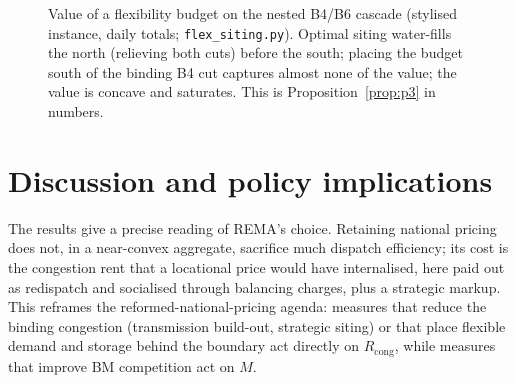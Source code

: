 \documentclass[review,3p,times]{elsarticle}
\theoremstyle{plain}
\theoremstyle{definition}
\begin{document}
\begin{figure}[t]
\centering
{}
\caption{Value of a flexibility budget on the nested B4/B6 cascade (stylised
instance, daily totals; \texttt{flex\_siting.py}). Optimal siting water-fills the
north (relieving both cuts) before the south; placing the budget south of the
binding B4 cut captures almost none of the value; the value is concave and
saturates. This is Proposition~\ref{prop:p3} in numbers.}
\label{fig:siting}
\end{figure}

\section{Discussion and policy implications}
\label{sec:discussion}

The results give a precise reading of REMA's choice. Retaining national pricing
does not, in a near-convex aggregate, sacrifice much dispatch efficiency; its
cost is the congestion rent that a locational price would have internalised,
here paid out as redispatch and socialised through balancing charges, plus a
strategic markup. This reframes the reformed-national-pricing agenda: measures
that reduce the binding congestion (transmission build-out, strategic siting) or
that place flexible demand and storage behind the boundary act directly on
$R_{\mathrm{cong}}$, while measures that improve BM competition act on $M$.
\end{document}
